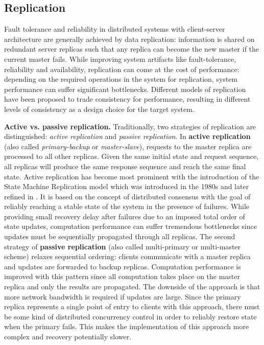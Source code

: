\subsection{Replication}
\label{sec:replication}

Fault tolerance and reliability in distributed systems with client-server architecture are generally achieved by data replication: information is shared on redundant server replicas such that any replica can become the new master if the current master fails. While improving system artifacts like fault-tolerance, reliability and availability, replication can come at the cost of performance: depending on the required operations in the system for replication, system performance can suffer significant bottlenecks. Different models of replication have been proposed to trade consistency for performance, resulting in different levels of consistency as a design choice for the target system.

\textbf{Active vs. passive replication.} Traditionally, two strategies of replication are distinguished: \textit{active replication} and \textit{passive replication}. In \textbf{active replication} (also called \textit{primary-backup} or \textit{master-slave}), requests to the master replica are processed to all other replicas. Given the same initial state and request sequence, all replicas will produce the same response sequence and reach the same final state. Active replication has become most prominent with the introduction of the State Machine Replication model which was introduced in the 1980s \cite{Lamport:1984} and later refined in \cite{Schneider:1990}. It is based on the concept of distributed consensus with the goal of reliably reaching a stable state of the system in the presence of failures. While providing small recovery delay after failures due to an imposed total order of state updates, computation performance can suffer tremendous bottlenecks since updates must be sequentially propagated through all replicas. The second strategy of \textbf{passive replication} (also called multi-primary or multi-master scheme) relaxes sequential ordering: clients communicate with a master replica and updates are forwarded to backup replicas. Computation performance is improved with this pattern since all computation takes place on the master replica and only the results are propagated. The downside of the approach is that more network bandwidth is required if updates are large. Since the primary replica represents a single point of entry to clients with this approach, there must be some kind of distributed concurrency control in order to reliably restore state when the primary fails. This makes the implementation of this approach more complex and recovery potentially slower.

